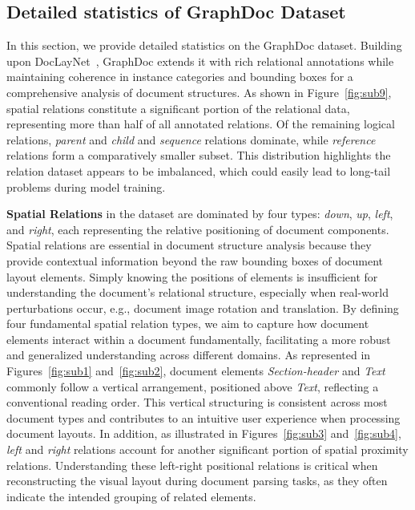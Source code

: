 \subsection{Detailed statistics of GraphDoc Dataset}
In this section, we provide detailed statistics on the GraphDoc dataset. Building upon DocLayNet~\citep{doclaynet2022}, GraphDoc extends it with rich relational annotations while maintaining coherence in instance categories and bounding boxes for a comprehensive analysis of document structures. As shown in Figure~\ref{fig:sub9}, spatial relations constitute a significant portion of the relational data, representing more than half of all annotated relations. Of the remaining logical relations, \textit{parent} and \textit{child} and \textit{sequence} relations dominate, while \textit{reference} relations form a comparatively smaller subset. This distribution
highlights the relation dataset appears to be imbalanced, which could easily lead to long-tail problems during model training.

\noindent \textbf{Spatial Relations} in the dataset are dominated by four types: \textit{down}, \textit{up}, \textit{left}, and \textit{right}, each representing the relative positioning of document components. {Spatial relations are essential in document structure analysis because they provide contextual information beyond the raw bounding boxes of document layout elements. Simply knowing the positions of elements is insufficient for understanding the document's relational structure, especially when real-world perturbations occur, e.g., document image rotation and translation. By defining four fundamental spatial relation types, we aim to capture how document elements interact within a document fundamentally, facilitating a more robust and generalized understanding across different domains. }As represented in Figures~\ref{fig:sub1} and~\ref{fig:sub2}, document elements \textit{Section-header} and \textit{Text} commonly follow a vertical arrangement, positioned above \textit{Text}, reflecting a conventional reading order. This vertical structuring is consistent across most document types and contributes to an intuitive user experience when processing document layouts. In addition, as illustrated in Figures~\ref{fig:sub3} and~\ref{fig:sub4}, \textit{left} and \textit{right} relations account for another significant portion of spatial proximity relations. Understanding these left-right positional relations is critical when reconstructing the visual layout during document parsing tasks, as they often indicate the intended grouping of related elements. 


